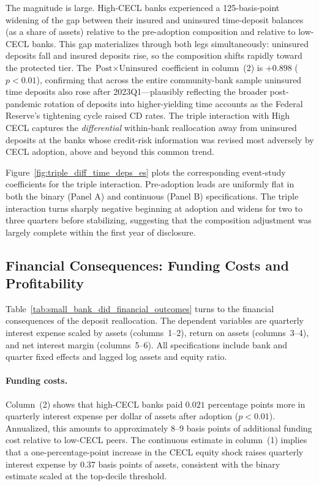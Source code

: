 The magnitude is large. High-CECL banks experienced a 125-basis-point widening
of the gap between their insured and uninsured time-deposit balances (as a share
of assets) relative to the pre-adoption composition and relative to low-CECL
banks. This gap materializes through both legs simultaneously: uninsured deposits
fall and insured deposits rise, so the composition shifts rapidly toward the
protected tier. The $\text{Post} \times \text{Uninsured}$ coefficient in
column~(2) is $+0.898$ ($p < 0.01$), confirming that across the entire
community-bank sample uninsured time deposits also rose after 2023Q1---plausibly
reflecting the broader post-pandemic rotation of deposits into higher-yielding
time accounts as the Federal Reserve's tightening cycle raised CD rates. The
triple interaction with High CECL captures the \textit{differential} within-bank
reallocation away from uninsured deposits at the banks whose credit-risk
information was revised most adversely by CECL adoption, above and beyond this
common trend.

Figure~\ref{fig:triple_diff_time_deps_es} plots the corresponding event-study
coefficients for the triple interaction. Pre-adoption leads are uniformly flat in
both the binary (Panel A) and continuous (Panel B) specifications. The triple
interaction turns sharply negative beginning at adoption and widens for two to
three quarters before stabilizing, suggesting that the composition adjustment was
largely complete within the first year of disclosure.

\subsection{Financial Consequences: Funding Costs and Profitability}
\label{sec:results:financial}

Table~\ref{tab:small_bank_did_financial_outcomes} turns to the financial
consequences of the deposit reallocation. The dependent variables are quarterly
interest expense scaled by assets (columns~1--2), return on assets (columns~3--4),
and net interest margin (columns~5--6). All specifications include bank and
quarter fixed effects and lagged log assets and equity ratio.

\paragraph{Funding costs.}
Column~(2) shows that high-CECL banks paid $0.021$ percentage points more in
quarterly interest expense per dollar of assets after adoption ($p < 0.01$).
Annualized, this amounts to approximately 8--9 basis points of additional funding
cost relative to low-CECL peers. The continuous estimate in column~(1)
implies that a one-percentage-point increase in the CECL equity shock raises
quarterly interest expense by 0.37 basis points of assets, consistent with the
binary estimate scaled at the top-decile threshold.

